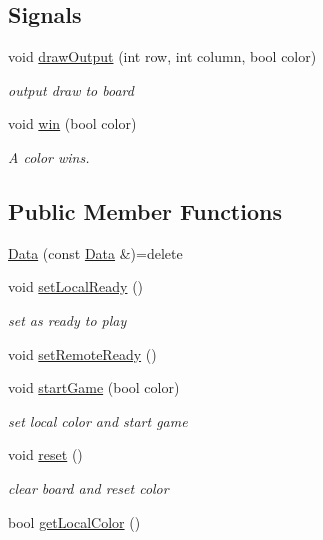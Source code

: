 \subsection*{Signals}
\begin{DoxyCompactItemize}
\item 
void \hyperlink{classData_a2ff062f4a7867e73c080f6f001cc074a}{draw\+Output} (int row, int column, bool color)
\begin{DoxyCompactList}\small\item\em output draw to board \end{DoxyCompactList}\item 
void \hyperlink{classData_a2331d231b898355973181c02c6a53042}{win} (bool color)
\begin{DoxyCompactList}\small\item\em A color wins. \end{DoxyCompactList}\end{DoxyCompactItemize}
\subsection*{Public Member Functions}
\begin{DoxyCompactItemize}
\item 
\hyperlink{classData_abcae162153c8d0a55bb89919f5ccba03}{Data} (const \hyperlink{classData}{Data} \&)=delete
\item 
void \hyperlink{classData_aeb1e91a5f2ce9d978a28d1aed4ac46c2}{set\+Local\+Ready} ()
\begin{DoxyCompactList}\small\item\em set as ready to play \end{DoxyCompactList}\item 
void \hyperlink{classData_ab2b27bfac830989abd87c2cc2f188d53}{set\+Remote\+Ready} ()
\item 
void \hyperlink{classData_a8db5b20b0fe960b7f13819d59a5a1a09}{start\+Game} (bool color)
\begin{DoxyCompactList}\small\item\em set local color and start game \end{DoxyCompactList}\item 
void \hyperlink{classData_ae974ac11bbc2330fb43c9bb03f60f3cf}{reset} ()
\begin{DoxyCompactList}\small\item\em clear board and reset color \end{DoxyCompactList}\item 
bool \hyperlink{classData_a57c47976e11427223f0f18e99f19a09f}{get\+Local\+Color} ()
\end{DoxyCompactItemize}
